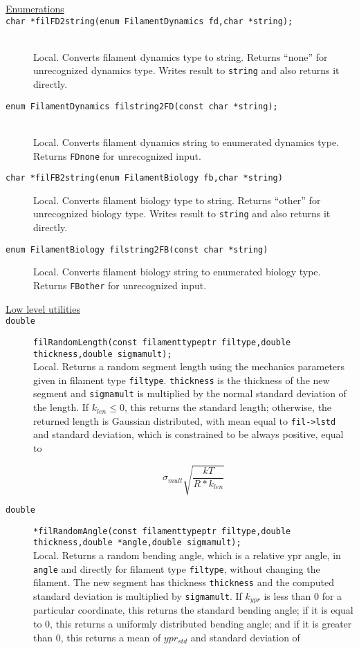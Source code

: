 \documentclass {scrbook}
\newcommand {\ttt} {\texttt}
\begin{document}
\begin{description}

\item[\underline{Enumerations}]

\item[\ttt{char *filFD2string(enum FilamentDynamics fd,char *string);}]
\hfill \\
Local. Converts filament dynamics type to string. Returns ``none'' for unrecognized dynamics type. Writes result to \ttt{string} and also returns it directly.

\item[\ttt{enum FilamentDynamics filstring2FD(const char *string);}]
\hfill \\
Local. Converts filament dynamics string to enumerated dynamics type. Returns \ttt{FDnone} for unrecognized input.

\item[\ttt{char *filFB2string(enum FilamentBiology fb,char *string)}]
Local. Converts filament biology type to string. Returns ``other'' for unrecognized biology type. Writes result to \ttt{string} and also returns it directly.

\item[\ttt{enum FilamentBiology filstring2FB(const char *string)}]
Local. Converts filament biology string to enumerated biology type. Returns \ttt{FBother} for unrecognized input.


\item[\underline{Low level utilities}]

\item[\ttt{double}]
\ttt{filRandomLength(const filamenttypeptr filtype,double thickness,double sigmamult);}
\hfill \\
Local. Returns a random segment length using the mechanics parameters given in filament type \ttt{filtype}. \ttt{thickness} is the thickness of the new segment and \ttt{sigmamult} is multiplied by the normal standard deviation of the length. If $k_{len} \leq 0$, this returns the standard length; otherwise, the returned length is Gaussian distributed, with mean equal to \ttt{fil->lstd} and standard deviation, which is constrained to be always positive, equal to

$$\sigma_{mult}\sqrt{\frac{kT}{R*k_{len}}}$$

\item[\ttt{double}]
\ttt{*filRandomAngle(const filamenttypeptr filtype,double thickness,double *angle,double sigmamult);}
\hfill \\
Local. Returns a random bending angle, which is a relative ypr angle, in \ttt{angle} and directly for filament type \ttt{filtype}, without changing the filament. The new segment has thickness \ttt{thickness} and the computed standard deviation is multiplied by \ttt{sigmamult}. If $k_{ypr}$ is less than 0 for a particular coordinate, this returns the standard bending angle; if it is equal to 0, this returns a uniformly distributed bending angle; and if it is greater than 0, this returns a mean of $ypr_{std}$ and standard deviation of


\end{description}
\end{document}
